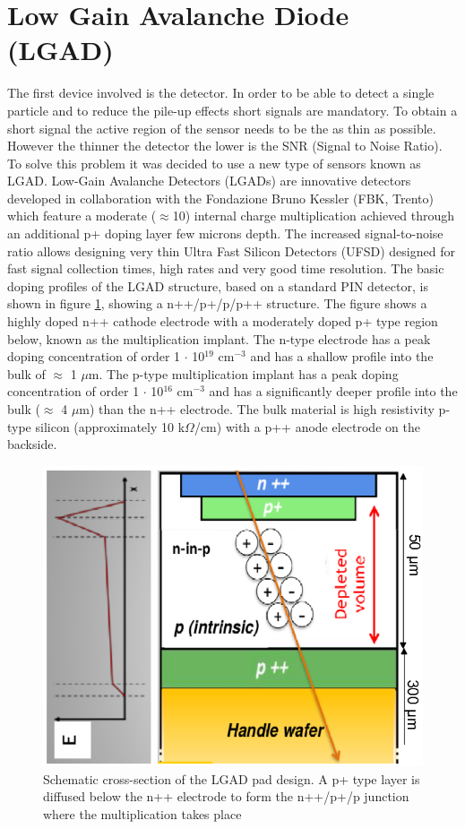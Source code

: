 \section{Low Gain Avalanche Diode (LGAD)}\label{lgad}
\noindent The first device involved is the detector. In order to be able to detect a single particle and to reduce the pile-up effects short signals are mandatory. To obtain a short signal the active region of the sensor needs to be the as thin as possible. However the thinner the detector the lower is the SNR (Signal to Noise Ratio).
To solve this problem it was decided to use a new type of sensors known as LGAD.
\noindent Low-Gain Avalanche Detectors (LGADs) are innovative detectors developed in collaboration with the Fondazione Bruno Kessler (FBK, Trento) which feature a moderate ($\approx$10) internal charge multiplication achieved through an additional p+ doping layer few microns depth. The increased signal-to-noise ratio allows designing very thin Ultra Fast Silicon Detectors (UFSD) designed for fast signal collection times, high rates and very good time resolution\cite{lgad}.
The basic doping profiles of the LGAD structure, based on a standard PIN detector, is shown in
figure \ref{fig:ufsdlgad}, showing a n++/p+/p/p++ structure.
The figure shows a highly doped n++ cathode electrode with a moderately doped p+ type region
below, known as the multiplication implant. The n-type electrode has a peak doping concentration
of order 1 $\cdot$ 10$^{19}$ cm$^{-3}$ and has a shallow profile into the bulk of $\approx$ 1 $\mu$m.
The p-type multiplication implant has a peak doping concentration of order 1 $\cdot$ 10$^{16}$ cm$^{-3}$
and has a significantly deeper profile into the bulk ($\approx$ 4 $\mu$m) than the n++ electrode. The bulk
material is high resistivity p-type silicon (approximately 10 k$\Omega$/cm) with a p++ anode electrode
on the backside.
\begin{figure}[H]
	\centering
	\includegraphics[width=0.35\linewidth]{IMG/ch2/UFSDLGAD.png}
	\caption{Schematic cross-section of the LGAD pad design. A p+ type layer is diffused below the n++ electrode to form the n++/p+/p junction where the multiplication takes place}
	\label{fig:ufsdlgad}
\end{figure}
